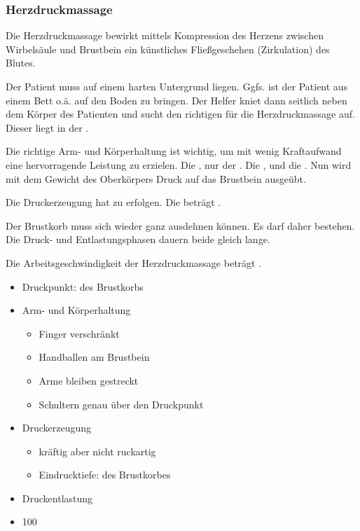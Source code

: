 \subsubsection{Herzdruckmassage}

Die Herzdruckmassage bewirkt mittels Kompression des Herzens
zwischen Wirbelsäule und Brustbein ein künstliches Fließgeschehen
(Zirkulation) des Blutes.

{
 Der Patient muss auf einem
harten Untergrund liegen. Ggfs. ist der Patient aus einem Bett
    o.ä. auf den Boden zu bringen. Der Helfer kniet
    dann seitlich neben dem Körper des Patienten und sucht
    den richtigen  für die Herzdruckmassage
    auf. Dieser liegt in der .

 Die richtige
    Arm- und Körperhaltung ist wichtig, um mit wenig Kraftaufwand eine
    hervorragende Leistung zu erzielen. Die , nur der .
    Die , und die . Nun wird mit dem Gewicht des Oberkörpers Druck auf das Brustbein ausgeübt.

 Die
    Druckerzeugung hat  zu
    erfolgen. Die  beträgt .

 Der Brustkorb muss sich wieder ganz
    ausdehnen können. Es darf daher  bestehen. Die Druck-
    und Entlastungsphasen dauern beide gleich lange.

 Die Arbeitsgeschwindigkeit der
    Herzdruckmassage beträgt .

}{
\begin{itemize}
    \item Druckpunkt:  des Brustkorbs
    \item Arm- und Körperhaltung
    \begin{itemize}
        \item Finger verschränkt 
        \item Handballen am Brustbein
        \item Arme bleiben gestreckt
        \item Schultern genau über den Druckpunkt
    \end{itemize}
    \item Druckerzeugung
    \begin{itemize}
        \item kräftig aber nicht ruckartig
        \item Eindrucktiefe:  des Brustkorbes
    \end{itemize}
    \item Druckentlastung
    \item 100\,
\end{itemize}
}{}{}{}

